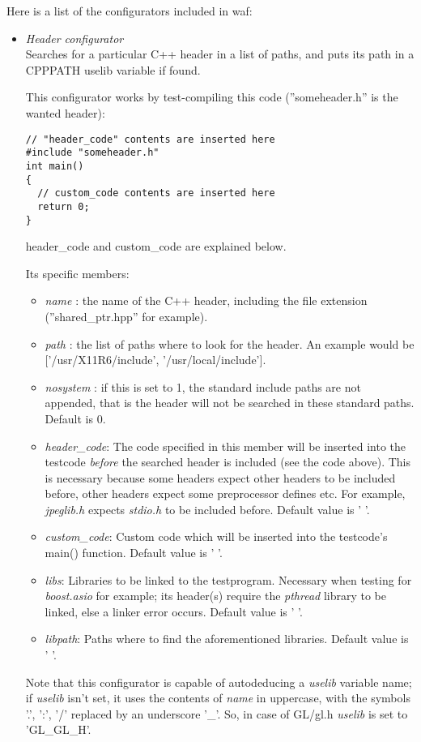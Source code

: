 \documentclass[a4,10pt]{article}
\begin{document}
Here is a list of the configurators included in waf:

\begin{itemize}
	\item \emph{Header configurator}\\
	Searches for a particular C++ header in a list of paths, and puts its path in a CPPPATH uselib variable if found.

	This configurator works by test-compiling this code (''someheader.h'' is the wanted header):
	\begin{lstlisting}
// "header_code" contents are inserted here
#include "someheader.h"
int main()
{
  // custom_code contents are inserted here
  return 0;
}
	\end{lstlisting}
	header\_code and custom\_code are explained below.

	Its specific members:
	\begin{itemize}
		\item \emph{name} : the name of the C++ header, including the file extension (''shared\_ptr.hpp'' for example).
		\item \emph{path} : the list of paths where to look for the header. An example would be ['/usr/X11R6/include', '/usr/local/include'].
		\item \emph{nosystem} : if this is set to 1, the standard include paths are not appended, that is the header will not be searched in these standard paths. Default is 0.
		\item \emph{header\_code}: The code specified in this member will be inserted into the testcode \emph{before} the searched header is included (see the code above). This is necessary because some headers expect other headers to be included before, other headers expect some preprocessor defines etc. For example, \emph{jpeglib.h} expects \emph{stdio.h} to be included before. Default value is ' '.
		\item \emph{custom\_code}: Custom code which will be inserted into the testcode's main() function. Default value is ' '.
		\item \emph{libs}: Libraries to be linked to the testprogram. Necessary when testing for \emph{boost.asio} for example; its header(s) require the \emph{pthread} library to be linked, else a linker error occurs. Default value is ' '.
		\item \emph{libpath}: Paths where to find the aforementioned libraries. Default value is ' '.
	\end{itemize}
	Note that this configurator is capable of autodeducing a \emph{uselib} variable name; if \emph{uselib} isn't set, it uses the contents of \emph{name} in uppercase, with the symbols '.', ':', '/' replaced by an underscore '\_'. So, in case of GL/gl.h \emph{uselib} is set to 'GL\_GL\_H'.


\end{itemize}
\end{document}
